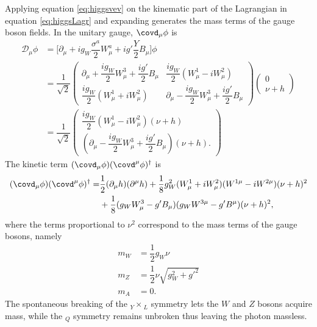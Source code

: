 Applying equation \ref{eq:higgsvev} on the kinematic part of the Lagrangian in equation \ref{eq:higgsLagr} and expanding generates the mass terms of the gauge boson fields. In the unitary gauge, $\covd_{\mu}\phi$ is
\begin{align}
    \mathcal{D}_{\mu}\phi & = \Big[\partial_{\mu}+ig_W\dfrac{\sigma^a}{2}W^a_{\mu}+ig'\dfrac{Y}{2}B_{\mu}\Big]\phi\\
        & = \dfrac{1}{\sqrt{2}}
        \begin{pmatrix}
             \partial_{\mu} + \dfrac{ig_W}{2}W_{\mu}^3 + \dfrac{ig'}{2}B_{\mu} & \dfrac{ig_W}{2}(W_{\mu}^1-iW_{\mu}^2) \\
             \dfrac{ig_W}{2}(W_{\mu}^1+iW_{\mu}^2) & \partial_{\mu} - \dfrac{ig_W}{2}W_{\mu}^3 + \dfrac{ig'}{2}B_{\mu}
        \end{pmatrix}
        \begin{pmatrix}
             0 \\
             \nu+h
        \end{pmatrix}\\
        & = \dfrac{1}{\sqrt{2}}
        \begin{pmatrix}
             \dfrac{ig_W}{2}(W_{\mu}^1-iW_{\mu}^2)(\nu+h)\\
             (\partial_{\mu}-\dfrac{ig_W}{2}W_{\mu}^3+\dfrac{ig'}{2}B_{\mu})(\nu+h).
        \end{pmatrix}
\end{align}
The kinetic term $(\covd_{\mu}\phi)(\covd^{\mu}\phi)^{\dagger}$ is
\begin{align}
    (\covd_{\mu}\phi)(\covd^{\mu}\phi)^{\dagger} = &  \dfrac{1}{2}(\partial_{\mu}h)(\partial^{\mu}h) + \dfrac{1}{8}g_ W^2(W_{\mu}^1+iW_{\mu}^2)(W^{1\mu}-iW^{2\mu})(\nu+h)^2\\
    & + \dfrac{1}{8}(g_W W_{\mu}^3 - g'B_{\mu})(g_W W^{3\mu} - g'B^{\mu})(\nu+h)^2,
\end{align}
where the terms proportional to $\nu^2$ correspond to the mass terms of the gauge bosons, namely
\begin{align}
    m_W & =\dfrac{1}{2}g_{W}\nu\\
    m_Z & =\dfrac{1}{2}\nu\sqrt{g_W^2+g'^2}\\
    m_A & =0.
\end{align}
The spontaneous breaking of the $_Y\times$$_{L}$ symmetry lets the $W$ and $Z$ bosons acquire mass, while the $_Q$ symmetry remains unbroken thus leaving the photon massless. 

